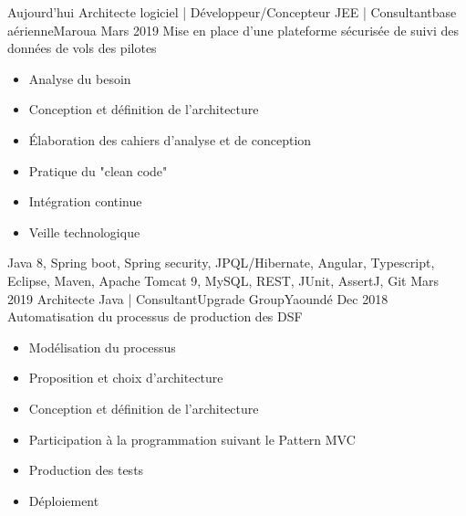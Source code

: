 %
%
%
\begin{experiences}
  \consultantexperience
    {Aujourd'hui} {Architecte logiciel | Développeur/Concepteur JEE | Consultant}{base aérienne}{Maroua}
    {Mars 2019}    {Mise en place d'une plateforme sécurisée de suivi des données de vols des pilotes}{}
                    {
                      \begin{itemize}
                        \item Analyse du besoin
                        \item Conception et définition de l'architecture
                        \item Élaboration des cahiers d'analyse et de conception
                        \item Pratique du "clean code"
                        \item Intégration continue
                        \item Veille technologique                                                                    
                      \end{itemize}
                    }
                    {Java 8, Spring boot, Spring security, JPQL/Hibernate, Angular, Typescript, Eclipse, Maven, Apache Tomcat 9, MySQL, REST, JUnit, AssertJ, Git}
  \emptySeparator
  \consultantexperience
    {Mars 2019} {Architecte Java | Consultant}{Upgrade Group}{Yaoundé}
    {Dec 2018}    {Automatisation du processus de production des DSF }{}
                    {
                      \begin{itemize}
                        \item Modélisation du processus
                        \item Proposition et choix d'architecture
                        \item Conception et définition de l'architecture
                        \item Participation à la programmation suivant le Pattern MVC
                        \item Production des tests
                        \item Déploiement

\end{itemize}}
\end{experiences}
